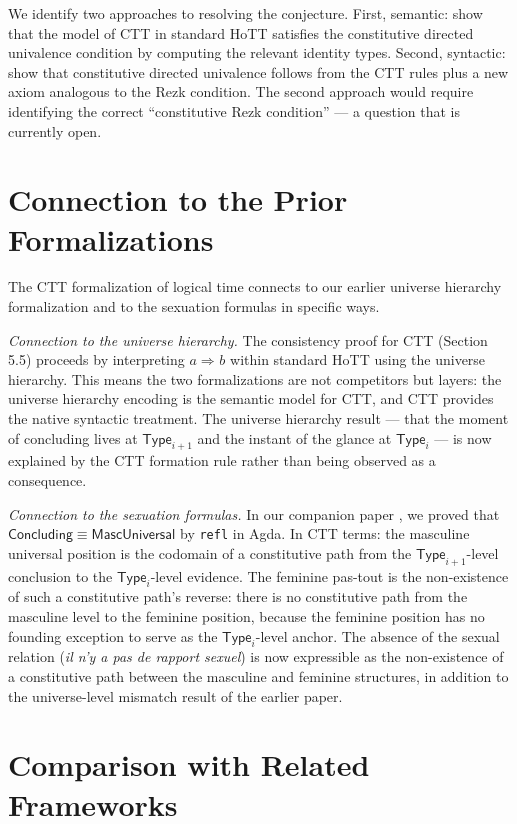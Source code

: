 \documentclass[12pt]{article}
\theoremstyle{definition}
\theoremstyle{remark}
\newcommand{\Type}[1]{\mathsf{Type}_{#1}}
\newcommand{\consthom}[3]{#2 \Rightarrow_{#1} #3}
\newcommand{\rapport}{\textit{il n'y a pas de rapport sexuel}}
\begin{document}
We identify two approaches to resolving the conjecture. First, semantic: show that the model of CTT in standard HoTT satisfies the constitutive directed univalence condition by computing the relevant identity types. Second, syntactic: show that constitutive directed univalence follows from the CTT rules plus a new axiom analogous to the Rezk condition. The second approach would require identifying the correct ``constitutive Rezk condition'' --- a question that is currently open.

\section{Connection to the Prior Formalizations}

The CTT formalization of logical time connects to our earlier universe hierarchy formalization \cite{papathanasiou2026d} and to the sexuation formulas \cite{papathanasiou2026c} in specific ways.

\textit{Connection to the universe hierarchy.} The consistency proof for CTT (Section 5.5) proceeds by interpreting $\consthom{}{a}{b}$ within standard HoTT using the universe hierarchy. This means the two formalizations are not competitors but layers: the universe hierarchy encoding is the semantic model for CTT, and CTT provides the native syntactic treatment. The universe hierarchy result --- that the moment of concluding lives at $\Type{i+1}$ and the instant of the glance at $\Type{i}$ --- is now explained by the CTT formation rule rather than being observed as a consequence.

\textit{Connection to the sexuation formulas.} In our companion paper \cite{papathanasiou2026c}, we proved that $\mathsf{Concluding} \equiv \mathsf{MascUniversal}$ by \texttt{refl} in Agda. In CTT terms: the masculine universal position is the codomain of a constitutive path from the $\Type{i+1}$-level conclusion to the $\Type{i}$-level evidence. The feminine pas-tout is the non-existence of such a constitutive path's reverse: there is no constitutive path from the masculine level to the feminine position, because the feminine position has no founding exception to serve as the $\Type{i}$-level anchor. The absence of the sexual relation (\rapport) is now expressible as the non-existence of a constitutive path between the masculine and feminine structures, in addition to the universe-level mismatch result of the earlier paper.

\section{Comparison with Related Frameworks}
\end{document}
